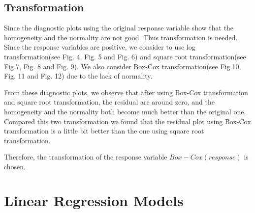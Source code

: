 \documentclass[conference,letterpaper]{IEEEtran}
\begin{document}
\subsection{{\fontsize{11}{13}\selectfont Transformation}}
{\fontsize{11}{13}\selectfont Since the diagnostic plots using the original response variable show that the homogeneity and the normality are not good. Thus transformation is needed. Since the response variables are positive, we consider to use log transformation(see Fig. 4, Fig. 5 and Fig. 6) and square root transformation(see Fig.7, Fig. 8 and Fig. 9). We also consider Box-Cox transformation(see Fig.10, Fig. 11 and Fig. 12) due to the lack of normality.

From these diagnostic plots, we observe that after using Box-Cox transformation and square root transformation, the residual are around zero, and the homogeneity and the normality both become much better than the original one. Compared this two transformation we found that the residual plot using Box-Cox transformation is a little bit better than the one using square root transformation. 

Therefore, the transformation of the response variable $Box-Cox(response)$ is chosen.}
\section{\large Linear Regression Models}
\end{document}
